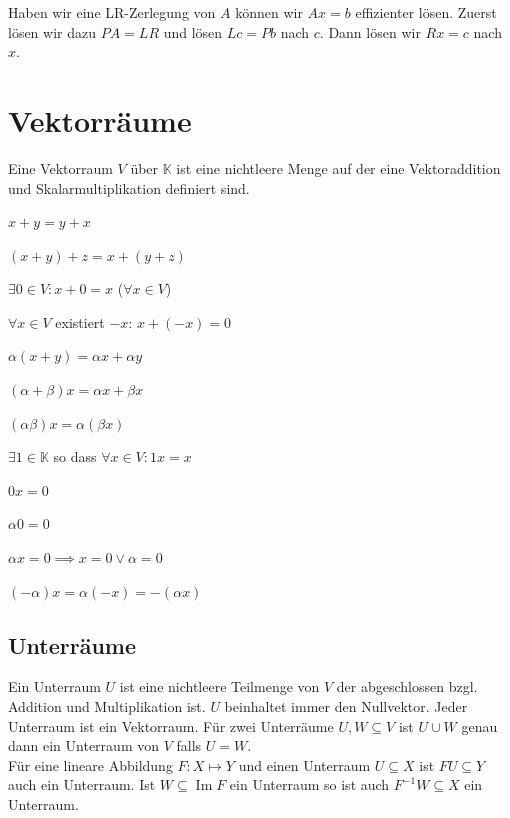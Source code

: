 \documentclass[a4paper,10pt]{article}
\DeclareMathOperator{\Image}{Im}
\def\K{\mathbb{K}}
\begin{document}
Haben wir eine LR-Zerlegung von $A$ können wir $Ax = b$ effizienter lösen. Zuerst lösen wir dazu $PA = LR$ und lösen $Lc = Pb$ nach $c$. Dann lösen wir $Rx = c$ nach $x$.

\section{Vektorräume}

\begin{mainbox}{}
  Eine Vektorraum $V$ über $\K$ ist eine nichtleere Menge auf der eine Vektoraddition und Skalarmultiplikation definiert sind.
  \begin{vaxioms}
    \item $x + y = y + x$
    \item $(x + y) + z = x + (y + z)$
    \item $\exists 0 \in V: x + 0 = x$ ($\forall x \in V$)
    \item $\forall x \in V$ existiert $-x$: $x + (-x) = 0$
    \item $\alpha(x + y) = \alpha x + \alpha y$
    \item $(\alpha + \beta)x = \alpha x + \beta x$
    \item $(\alpha \beta)x = \alpha (\beta x)$
    \item $\exists 1 \in \K$ so dass $\forall x \in V: 1x = x$
  \end{vaxioms}
\end{mainbox}

\begin{rowlist}
  \item $0x = 0$
  \item $\alpha 0 = 0$
  \item $\alpha x = 0 \implies x = 0 \vee \alpha = 0$
  \item $(-\alpha)x = \alpha (-x) = -(\alpha x)$
\end{rowlist}

\subsection{Unterräume}

Ein Unterraum $U$ ist eine nichtleere Teilmenge von $V$ der abgeschlossen bzgl. Addition und Multiplikation ist. $U$ beinhaltet immer den Nullvektor. Jeder Unterraum ist ein Vektorraum. Für zwei Unterräume $U, W \subseteq V$ ist $U \cup W$ genau dann ein Unterraum von $V$ falls $U = W$.\\

Für eine lineare Abbildung $F: X \mapsto Y$ und einen Unterraum $U \subseteq X$ ist $FU \subseteq Y$ auch ein Unterraum. Ist $W \subseteq \Image F$ ein Unterraum so ist auch $F^{-1}W \subseteq X$ ein Unterraum.
\end{document}
